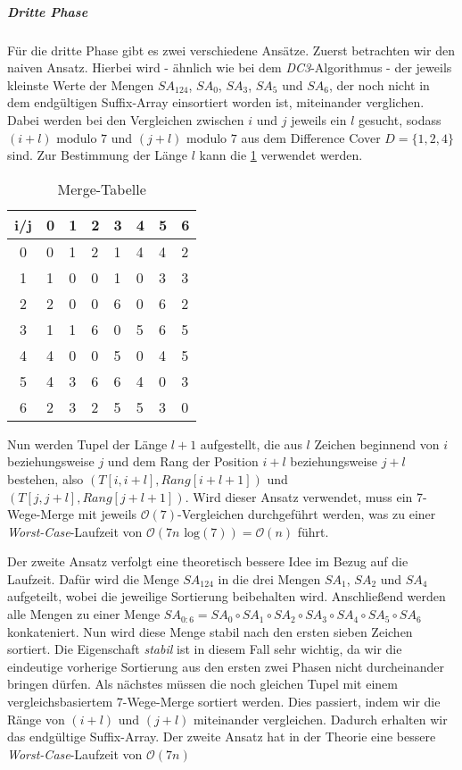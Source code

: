\subparagraph*{Dritte Phase}

Für die dritte Phase gibt es zwei verschiedene Ansätze. Zuerst betrachten wir den naiven Ansatz. Hierbei wird - ähnlich wie bei dem \emph{DC3}-Algorithmus - der jeweils kleinste Werte der Mengen $SA_{124}$, $SA_0$, $SA_3$, $SA_5$ und  $SA_6$, der noch nicht in dem endgültigen Suffix-Array einsortiert worden ist, miteinander verglichen. Dabei werden bei den Vergleichen zwischen $i$ und $j$ jeweils ein $l$ gesucht, sodass $(i + l) \text{ modulo } 7$ und $(j + l) \text{ modulo } 7$ aus dem Difference Cover $D = \{1, 2, 4\}$ sind. Zur Bestimmung der Länge $l$ kann die \cref{tab:merge} verwendet werden.

\begin{table}[H]
	\centering
	\begin{tabular}{c|lllllll}
		i/j & 0 & 1 & 2 & 3 & 4 & 5 & 6 \\\hline
		0   & 0 & 1 & 2 & 1 & 4 & 4 & 2 \\
		1   & 1 & 0 & 0 & 1 & 0 & 3 & 3 \\
		2   & 2 & 0 & 0 & 6 & 0 & 6 & 2 \\
		3   & 1 & 1 & 6 & 0 & 5 & 6 & 5 \\
		4   & 4 & 0 & 0 & 5 & 0 & 4 & 5 \\
		5   & 4 & 3 & 6 & 6 & 4 & 0 & 3 \\
		6   & 2 & 3 & 2 & 5 & 5 & 3 & 0
	\end{tabular}
	\caption{Merge-Tabelle}
	\label{tab:merge}
\end{table}

Nun werden Tupel der Länge $l+1$ aufgestellt, die aus $l$ Zeichen beginnend von $i$ beziehungsweise $j$ und dem Rang der Position $i+l$ beziehungsweise $j+l$ bestehen, also $(T[i, i+l], Rang[i+l+1])$ und $(T[j, j+l], Rang[j+l+1])$. Wird dieser Ansatz verwendet, muss ein 7-Wege-Merge mit jeweils $\mathcal{O}(7)$-Vergleichen durchgeführt werden, was zu einer \emph{Worst-Case}-Laufzeit von $\mathcal{O}(7n \text{ log} (7)) = \mathcal{O}(n) $ führt.

Der zweite Ansatz verfolgt eine theoretisch bessere Idee im Bezug auf die Laufzeit. Dafür wird die Menge $SA_{124}$ in die drei Mengen $SA_1$, $SA_2$ und $SA_4$ aufgeteilt, wobei die jeweilige Sortierung beibehalten wird. Anschließend werden alle Mengen zu einer Menge $SA_{0:6} = SA_0 \circ SA_1 \circ SA_2 \circ SA_3 \circ SA_4 \circ SA_5 \circ SA_6$ konkateniert. Nun wird diese Menge stabil nach den ersten sieben Zeichen sortiert. Die Eigenschaft \emph{stabil} ist in diesem Fall sehr wichtig, da wir die eindeutige vorherige Sortierung aus den ersten zwei Phasen nicht durcheinander bringen dürfen. Als nächstes müssen die noch gleichen Tupel mit einem vergleichsbasiertem $7$-Wege-Merge sortiert werden. Dies passiert, indem wir die Ränge von $(i+l)$ und $(j+l)$ miteinander vergleichen. Dadurch erhalten wir das endgültige Suffix-Array. Der zweite Ansatz hat in der Theorie eine bessere \emph{Worst-Case}-Laufzeit von $\mathcal{O}(7n)$

